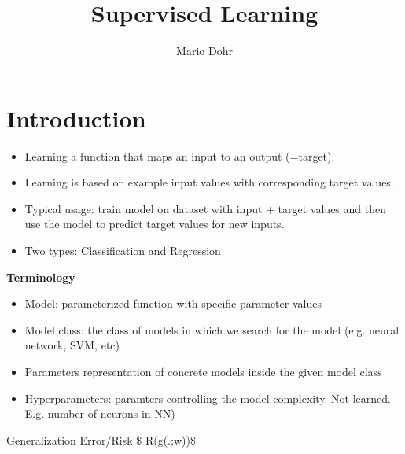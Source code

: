 \documentclass[10pt,a4paper]{article}
\author{Mario Dohr}
\title{Supervised Learning}
\begin{document}
\maketitle
\section{Introduction}
\begin{itemize}
\item Learning a function that maps an input to an output (=target).
\item Learning is based on example input values with corresponding target values.
\item Typical usage: train model on dataset with input + target values and then use the model to predict target values for new inputs.
\item Two types: Classification and Regression
\end{itemize}

\textbf{Terminology}
\begin{itemize}
\item Model: parameterized function with specific parameter values
\item Model class: the class of models in which we search for the model (e.g. neural network, SVM, etc)
\item Parameters representation of concrete models inside the given model class
\item Hyperparameters: paramters controlling the model complexity. Not learned. E.g. number of neurons in NN)
\end{itemize}

Generalization Error/Risk
\$ R(g(.;w))\$
\end{document}
